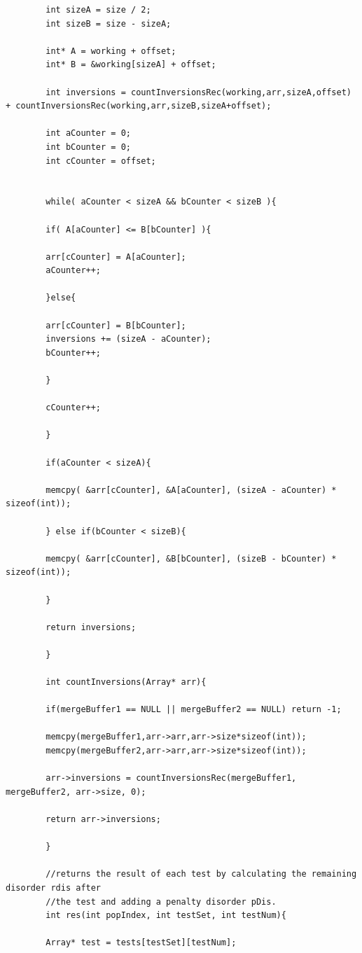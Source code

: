 \documentclass{article}
\begin{document}
\begin{lstlisting}
	    int sizeA = size / 2;
	    int sizeB = size - sizeA;
	    
	    int* A = working + offset;
	    int* B = &working[sizeA] + offset;
	    
	    int inversions = countInversionsRec(working,arr,sizeA,offset) + countInversionsRec(working,arr,sizeB,sizeA+offset);
	    
	    int aCounter = 0;
	    int bCounter = 0;
	    int cCounter = offset;
	    
	    
	    while( aCounter < sizeA && bCounter < sizeB ){
	    
	    if( A[aCounter] <= B[bCounter] ){
	    
	    arr[cCounter] = A[aCounter];
	    aCounter++;
	    
	    }else{
	    
	    arr[cCounter] = B[bCounter];
	    inversions += (sizeA - aCounter);
	    bCounter++;
	    
	    }
	    
	    cCounter++;
	    
	    }
	    
	    if(aCounter < sizeA){
	    
	    memcpy( &arr[cCounter], &A[aCounter], (sizeA - aCounter) * sizeof(int));
	    
	    } else if(bCounter < sizeB){
	    
	    memcpy( &arr[cCounter], &B[bCounter], (sizeB - bCounter) * sizeof(int));
	    
	    }    
	    
	    return inversions;
	    
	    }
	    
	    int countInversions(Array* arr){
	    
	    if(mergeBuffer1 == NULL || mergeBuffer2 == NULL) return -1;
	    
	    memcpy(mergeBuffer1,arr->arr,arr->size*sizeof(int));
	    memcpy(mergeBuffer2,arr->arr,arr->size*sizeof(int));
	    
	    arr->inversions = countInversionsRec(mergeBuffer1, mergeBuffer2, arr->size, 0);
	    
	    return arr->inversions;
	    
	    }
	    
	    //returns the result of each test by calculating the remaining disorder rdis after
	    //the test and adding a penalty disorder pDis.
	    int res(int popIndex, int testSet, int testNum){
	    
	    Array* test = tests[testSet][testNum];
	    

\end{lstlisting}
\end{document}
